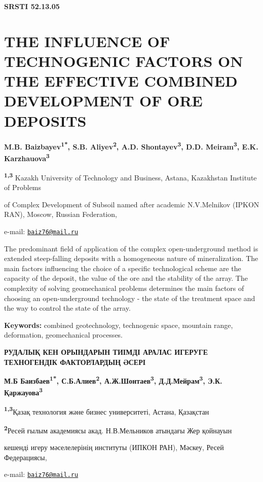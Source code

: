 \clearpage
{\bfseries SRSTI 52.13.05}

\section{THE INFLUENCE OF TECHNOGENIC FACTORS ON THE EFFECTIVE COMBINED DEVELOPMENT OF ORE DEPOSITS}

\begin{center}
{\bfseries M.B. Baizbayev\textsuperscript{1*}, S.B.
Aliyev\textsuperscript{2}, A.D. Shontayev\textsuperscript{3}, D.D.
Meiram\textsuperscript{3}, E.K. Karzhauova\textsuperscript{3}}

{\bfseries \textsuperscript{1,3}} Kazakh University of Technology and
Business, Astana, Kazakhstan Institute of Problems

of Complex Development of Subsoil named after academic N.V.Melnikov
(IPKON RAN), Moscow, Russian Federation,

e-mail: \href{mailto:baiz76@mail.ru}{\nolinkurl{baiz76@mail.ru}}
\end{center}

The predominant field of application of the complex open-underground
method is extended steep-falling deposits with a homogeneous nature of
mineralization. The main factors influencing the choice of a specific
technological scheme are the capacity of the deposit, the value of the
ore and the stability of the array. The complexity of solving
geomechanical problems determines the main factors of choosing an
open-underground technology - the state of the treatment space and the
way to control the state of the array.

{\bfseries Keywords:} combined geotechnology, technogenic space, mountain
range, deformation, geomechanical processes.

\begin{center}
{\large\bfseries РУДАЛЫҚ КЕН ОРЫНДАРЫН ТИІМДІ АРАЛАС ИГЕРУГЕ ТЕХНОГЕНДІК ФАКТОРЛАРДЫҢ ӘСЕРІ}

{\bfseries М.Б Баизбаев\textsuperscript{1*}, С.Б.Алиев\textsuperscript{2},
А.Ж.Шонтаев\textsuperscript{3}, Д.Д.Мейрам\textsuperscript{3}, Э.К.
Қаржауова\textsuperscript{3}}

{\bfseries \textsuperscript{1,3}}Қазақ технология және бизнес университеті,
Астана, Қазақстан

{\bfseries \textsuperscript{2}}Ресей ғылым академиясы акад. Н.В.Мельников
атындағы Жер қойнауын

кешенді игеру мәселелерінің институты (ИПКОН РАН), Мәскеу, Ресей
Федерациясы,

e-mail: \href{mailto:baiz76@mail.ru}{\nolinkurl{baiz76@mail.ru}}
\end{center}

